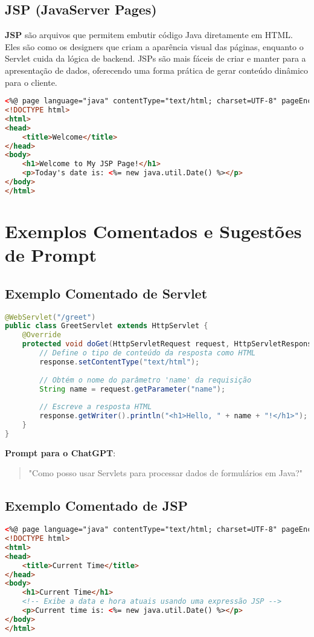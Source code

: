 \documentclass[a4paper,12pt]{book}
\begin{document}
\subsection{JSP (JavaServer Pages)}
\textbf{JSP} são arquivos que permitem embutir código Java diretamente em HTML. Eles são como os designers que criam a aparência visual das páginas, enquanto o Servlet cuida da lógica de backend. JSPs são mais fáceis de criar e manter para a apresentação de dados, oferecendo uma forma prática de gerar conteúdo dinâmico para o cliente.

\begin{lstlisting}[language=html,caption={Exemplo de JSP}]
<%@ page language="java" contentType="text/html; charset=UTF-8" pageEncoding="UTF-8"%>
<!DOCTYPE html>
<html>
<head>
    <title>Welcome</title>
</head>
<body>
    <h1>Welcome to My JSP Page!</h1>
    <p>Today's date is: <%= new java.util.Date() %></p>
</body>
</html>
\end{lstlisting}

\section{Exemplos Comentados e Sugestões de Prompt}

\subsection{Exemplo Comentado de Servlet}
\begin{lstlisting}[language=java,caption={Exemplo Comentado de Servlet}]
@WebServlet("/greet")
public class GreetServlet extends HttpServlet {
    @Override
    protected void doGet(HttpServletRequest request, HttpServletResponse response) throws ServletException, IOException {
        // Define o tipo de conteúdo da resposta como HTML
        response.setContentType("text/html");
        
        // Obtém o nome do parâmetro 'name' da requisição
        String name = request.getParameter("name");
        
        // Escreve a resposta HTML
        response.getWriter().println("<h1>Hello, " + name + "!</h1>");
    }
}
\end{lstlisting}

\textbf{Prompt para o ChatGPT}:
\begin{quote}
"Como posso usar Servlets para processar dados de formulários em Java?"
\end{quote}

\subsection{Exemplo Comentado de JSP}
\begin{lstlisting}[language=html,caption={Exemplo Comentado de JSP}]
<%@ page language="java" contentType="text/html; charset=UTF-8" pageEncoding="UTF-8"%>
<!DOCTYPE html>
<html>
<head>
    <title>Current Time</title>
</head>
<body>
    <h1>Current Time</h1>
    <!-- Exibe a data e hora atuais usando uma expressão JSP -->
    <p>Current time is: <%= new java.util.Date() %></p>
</body>
</html>
\end{lstlisting}
\end{document}
